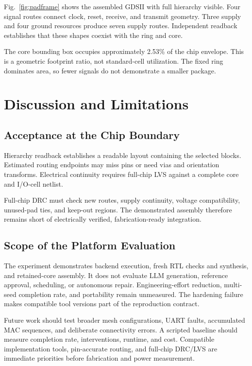 \documentclass[conference,letterpaper]{IEEEtran}
\begin{document}
Fig.~\ref{fig:padframe} shows the assembled GDSII with full hierarchy visible. Four signal routes connect clock, reset, receive, and transmit geometry. Three supply and four ground resources produce seven supply routes. Independent readback establishes that these shapes coexist with the ring and core.

The core bounding box occupies approximately 2.53\% of the chip envelope. This is a geometric footprint ratio, not standard-cell utilization. The fixed ring dominates area, so fewer signals do not demonstrate a smaller package.

\section{Discussion and Limitations}
\subsection{Acceptance at the Chip Boundary}
Hierarchy readback establishes a readable layout containing the selected blocks. Estimated routing endpoints may miss pins or need vias and orientation transforms. Electrical continuity requires full-chip LVS against a complete core and I/O-cell netlist.

Full-chip DRC must check new routes, supply continuity, voltage compatibility, unused-pad ties, and keep-out regions. The demonstrated assembly therefore remains short of electrically verified, fabrication-ready integration.

\subsection{Scope of the Platform Evaluation}
The experiment demonstrates backend execution, fresh RTL checks and synthesis, and retained-core assembly. It does not evaluate LLM generation, reference approval, scheduling, or autonomous repair. Engineering-effort reduction, multi-seed completion rate, and portability remain unmeasured. The hardening failure makes compatible tool versions part of the reproduction contract.

Future work should test broader mesh configurations, UART faults, accumulated MAC sequences, and deliberate connectivity errors. A scripted baseline should measure completion rate, interventions, runtime, and cost. Compatible implementation tools, pin-accurate routing, and full-chip DRC/LVS are immediate priorities before fabrication and power measurement.
\end{document}
